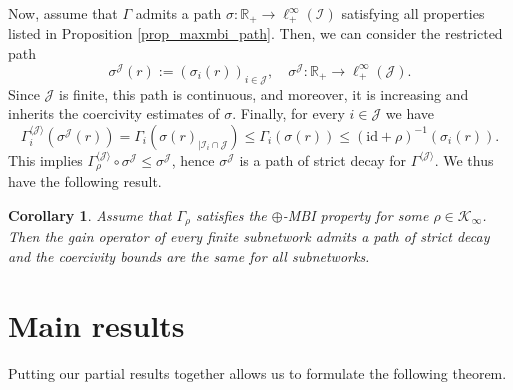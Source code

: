 \documentclass[10pt, oneside, a4paper]{article}
\newcommand{\R}{\mathbb{R}}
\newcommand{\id}{\mathrm{id}}
\newcommand{\IC}{\mathcal{I}}
\newcommand{\JC}{\mathcal{J}}
\newcommand{\KC}{\mathcal{K}}
\newtheorem{corollary}{Corollary}[section]
\begin{document}
Now, assume that $\Gamma$ admits a path $\sigma:\R_+ \rightarrow \ell^{\infty}_+(\IC)$ satisfying all properties listed in Proposition \ref{prop_maxmbi_path}. Then, we can consider the restricted path%
\begin{equation*}
  \sigma^{\JC}(r) := (\sigma_i(r))_{i \in \JC},\quad \sigma^{\JC}:\R_+ \rightarrow \ell^{\infty}_+(\JC).%
\end{equation*}
Since $\JC$ is finite, this path is continuous, and moreover, it is increasing and inherits the coercivity estimates of $\sigma$. Finally, for every $i \in \JC$ we have%
\begin{equation*}
  \Gamma^{\langle\JC\rangle}_i(\sigma^{\JC}(r)) = \Gamma_i( \sigma(r)_{|\IC_i \cap \JC} ) \leq \Gamma_i(\sigma(r)) \leq (\id + \rho)^{-1}(\sigma_i(r)).%
\end{equation*}
This implies $\Gamma^{\langle\JC\rangle}_{\rho} \circ \sigma^{\JC} \leq \sigma^{\JC}$, hence $\sigma^{\JC}$ is a path of strict decay for $\Gamma^{\langle \JC \rangle}$. We thus have the following result.%

\begin{corollary}\label{cor_finite_subnetworks}
Assume that $\Gamma_{\rho}$ satisfies the $\oplus$-MBI property for some $\rho \in \KC_{\infty}$. Then the gain operator of every finite subnetwork admits a path of strict decay and the coercivity bounds are the same for all subnetworks.
\end{corollary}

\section{Main results}\label{sec_final_theorem}

Putting our partial results together allows us to formulate the following theorem.%
\end{document}
